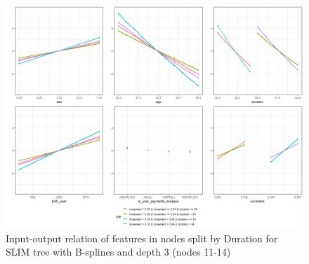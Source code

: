 \begin{figure}[!htb]
    \centering
    \includegraphics[width=16cm]{Figures/insurance_use_case/k1_08_BPV/effects_duration.png}
    \caption{Input-output relation of features in nodes split by Duration for SLIM tree with B-splines and depth 3 (nodes 11-14)}
    \label{fig:ins_k108_effects_duration}
\end{figure}






